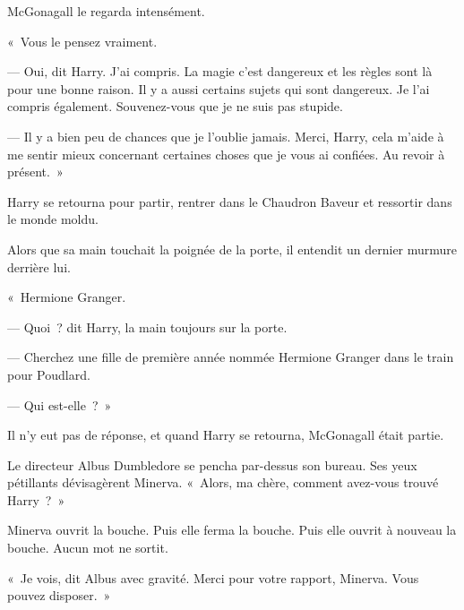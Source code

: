 McGonagall le regarda intensément.

«~Vous le pensez vraiment.

--- Oui, dit Harry. J'ai compris. La magie c'est dangereux et les règles sont là pour une bonne raison. Il y a aussi certains sujets qui sont dangereux.
Je l'ai compris également. Souvenez-vous que je ne suis pas stupide.

--- Il y a bien peu de chances que je l'oublie jamais. Merci, Harry, cela m'aide à me sentir mieux concernant certaines choses que je vous ai confiées. Au revoir à présent.~»

Harry se retourna pour partir, rentrer dans le Chaudron Baveur et ressortir dans le monde moldu.

Alors que sa main touchait la poignée de la porte, il entendit un dernier murmure derrière lui.

«~Hermione Granger.

--- Quoi~? dit Harry, la main toujours sur la porte.

--- Cherchez une fille de première année nommée Hermione Granger dans le train pour Poudlard.

--- Qui est-elle~?~»

Il n'y eut pas de réponse, et quand Harry se retourna, McGonagall était partie.


Le directeur Albus Dumbledore se pencha par-dessus son bureau. Ses yeux pétillants dévisagèrent Minerva. «~Alors, ma chère, comment avez-vous trouvé Harry~?~»

Minerva ouvrit la bouche. Puis elle ferma la bouche. Puis elle ouvrit à nouveau la bouche. Aucun mot ne sortit.

«~Je vois, dit Albus avec gravité. Merci pour votre rapport, Minerva. Vous pouvez disposer.~»

